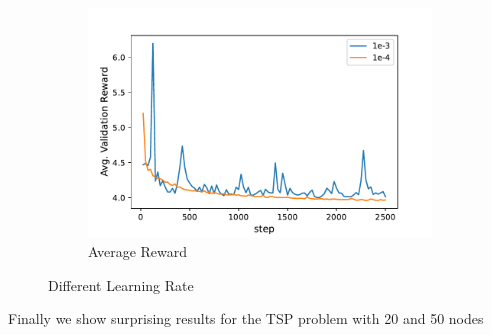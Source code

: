 \documentclass{article}
\theoremstyle{definition}
\begin{document}
\begin{enumerate}
\begin{figure}[H]
\begin{subfigure}{0.48\linewidth}
         \centering
         \includegraphics[width=0.9\linewidth]{images/lrreward.pdf}
         \caption{Average Reward}
     \end{subfigure}
     \caption{Different Learning Rate}
\end{figure}

\end{enumerate}

Finally we show surprising results for the TSP problem with 20 and 50 nodes
\end{document}
